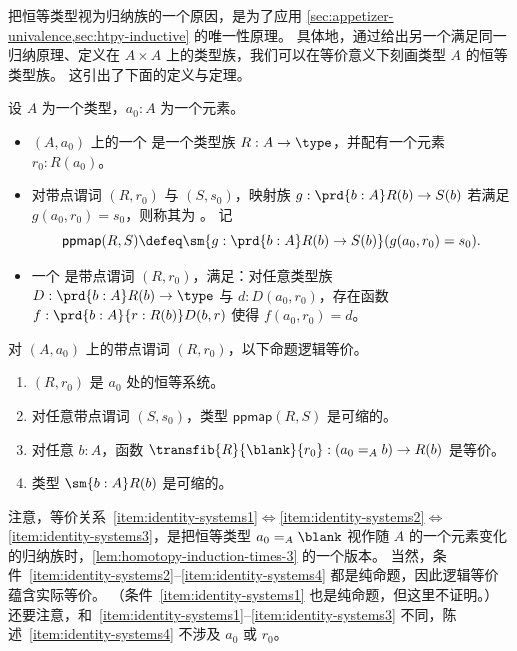 \mentalpause

把恒等类型视为归纳族的一个原因，是为了应用 \cref{sec:appetizer-univalence,sec:htpy-inductive} 的唯一性原理。
具体地，通过给出另一个满足同一归纳原理、定义在 $A\times A$ 上的类型族，我们可以在等价意义下刻画类型 $A$ 的恒等类型族。
这引出了下面的定义与定理。

%
%

\begin{defn}\label{defn:identity-systems}
  设 $A$ 为一个类型，$a_0:A$ 为一个元素。
  \begin{itemize}
  \item $(A,a_0)$ 上的一个 
    是一个类型族 $R:A\to\type$，并配有一个元素 $r_0:R(a_0)$。
  \item 对带点谓词 $(R,r_0)$ 与 $(S,s_0)$，映射族 $g:\prd{b:A} R(b) \to S(b)$ 若满足 $g(a_0, r_0)=s_0$，则称其为 。
    记
    \[ \mathsf{ppmap}(R,S) \defeq \sm{g:\prd{b:A} R(b) \to S(b)} (g(a_0, r_0)=s_0).\]
  \item 一个 
    是带点谓词 $(R,r_0)$，满足：对任意类型族 $D:\prd{b:A} R(b) \to \type$ 与 $d:D(a_0,r_0)$，存在函数 $f:\prd{b:A}{r:R(b)} D(b,r)$ 使得 $f(a_0,r_0)=d$。
\end{itemize}
\end{defn}

\begin{thm}\label{thm:identity-systems}
  对 $(A,a_0)$ 上的带点谓词 $(R,r_0)$，以下命题逻辑等价。
  \begin{enumerate}
  \item $(R,r_0)$ 是 $a_0$ 处的恒等系统。\label{item:identity-systems1}
  \item 对任意带点谓词 $(S,s_0)$，类型 $\mathsf{ppmap}(R,S)$ 是可缩的。\label{item:identity-systems2}
  \item 对任意 $b:A$，函数 $\transfib{R}{\blank}{r_0} : (a_0 =_A b) \to R(b)$ 是等价。\label{item:identity-systems3}
  \item 类型 $\sm{b:A} R(b)$ 是可缩的。\label{item:identity-systems4}
  \end{enumerate}
\end{thm}

注意，等价关系~\ref{item:identity-systems1}$\Leftrightarrow$\ref{item:identity-systems2}$\Leftrightarrow$\ref{item:identity-systems3}，是把恒等类型 $a_0 =_A \blank$ 视作随 $A$ 的一个元素变化的归纳族时，\cref{lem:homotopy-induction-times-3} 的一个版本。
当然，条件~\ref{item:identity-systems2}--\ref{item:identity-systems4} 都是纯命题，因此逻辑等价蕴含实际等价。
（条件~\ref{item:identity-systems1} 也是纯命题，但这里不证明。）
还要注意，和~\ref{item:identity-systems1}--\ref{item:identity-systems3} 不同，陈述~\ref{item:identity-systems4} 不涉及 $a_0$ 或 $r_0$。

